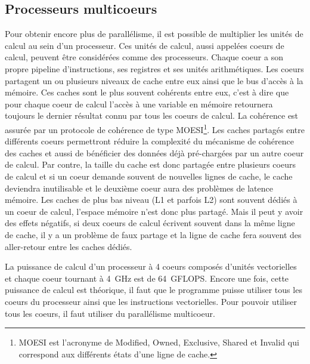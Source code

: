 \subsection{Processeurs multicoeurs}
Pour obtenir encore plus de parallélisme, il est possible de multiplier les unités de calcul au sein d'un processeur.
%
Ces unités de calcul, aussi appelées coeurs de calcul, peuvent être considérées comme des processeurs.
%
Chaque coeur a son propre pipeline d'instructions, ses registres et ses unités arithmétiques.
%
Les coeurs partagent un ou plusieurs niveaux de cache entre eux ainsi que le bus d'accès à la mémoire.
%
Ces caches sont le plus souvent cohérents entre eux, c'est à dire que pour chaque coeur de calcul l'accès à une variable en mémoire retournera toujours le dernier résultat connu par tous les coeurs de calcul.
%
La cohérence est assurée par un protocole de cohérence de type MOESI\footnote{MOESI est l'acronyme de Modified, Owned, Exclusive, Shared et Invalid qui correspond aux différents états d'une ligne de cache.}.
%
Les caches partagés entre différents coeurs permettront réduire la complexité du mécanisme de cohérence des caches et aussi de bénéficier des données déjà pré-chargées par un autre coeur de calcul.
%
Par contre, la taille du cache est donc partagée entre plusieurs coeurs de calcul et si un coeur demande souvent de nouvelles lignes de cache, le cache deviendra inutilisable et le deuxième coeur aura des problèmes de latence mémoire.
%
Les caches de plus bas niveau (L1 et parfois L2) sont souvent dédiés à un coeur de calcul, l'espace mémoire n'est donc plus partagé.
%
Mais il peut y avoir des effets négatifs, si deux coeurs de calcul écrivent souvent dans la même ligne de cache, il y a un problème de faux partage et la ligne de cache fera souvent des aller-retour entre les caches dédiés.



La puissance de calcul d'un processeur à 4 coeurs composés d'unités vectorielles et chaque coeur tournant à 4~GHz est de 64~GFLOPS.
%
Encore une fois, cette puissance de calcul est théorique, il faut que le programme puisse utiliser tous les coeurs du processeur ainsi que les instructions vectorielles.
%
Pour pouvoir utiliser tous les coeurs, il faut utiliser du parallélisme multicoeur.
